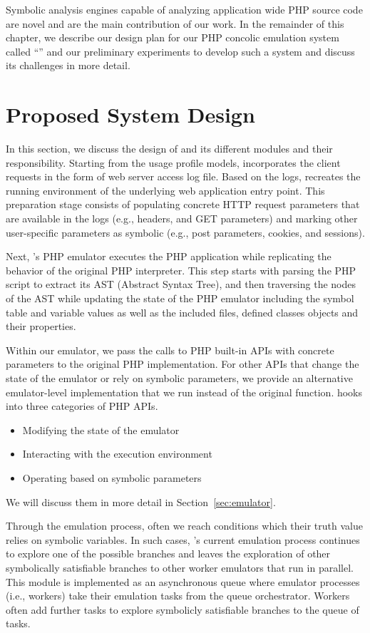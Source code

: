 Symbolic analysis engines capable of analyzing application wide PHP source code are novel and are the main contribution of our work. 
In the remainder of this chapter, we describe our design plan for our PHP concolic emulation system called ``\animatedead{}'' and our preliminary experiments to develop such a system and discuss its challenges in more detail. 

\section{Proposed System Design}
In this section, we discuss the design of \animatedead{} and its different modules and their responsibility. 
Starting from the usage profile models, \animatedead{} incorporates the client requests in the form of web server access log file. 
Based on the logs, \animatedead{} recreates the running environment of the underlying web application entry point. 
This preparation stage consists of populating concrete HTTP request parameters that are available in the logs (e.g., headers, and GET parameters) and marking other user-specific parameters as symbolic (e.g., post parameters, cookies, and sessions). 

Next, \animatedead{}'s PHP emulator executes the PHP application while replicating the behavior of the original PHP interpreter. 
This step starts with parsing the PHP script to extract its AST (Abstract Syntax Tree), and then traversing the nodes of the AST while updating the state of the PHP emulator including the symbol table and variable values as well as the included files, defined classes objects and their properties. 

Within our emulator, we pass the calls to PHP built-in APIs with concrete parameters to the original PHP implementation. 
For other APIs that change the state of the emulator or rely on symbolic parameters, we provide an alternative emulator-level implementation that we run instead of the original function. 
\animatedead{} hooks into three categories of PHP APIs. 
\begin{itemize}
    \item Modifying the state of the emulator
    \item Interacting with the execution environment
    \item Operating based on symbolic parameters
\end{itemize}
We will discuss them in more detail in Section~\ref{sec:emulator}.

Through the emulation process, often we reach conditions which their truth value relies on symbolic variables. 
In such cases, \animatedead{}'s current emulation process continues to explore one of the possible branches and leaves the exploration of other symbolically satisfiable branches to other worker emulators that run in parallel. 
This module is implemented as an asynchronous queue where emulator processes (i.e., workers) take their emulation tasks from the queue orchestrator. 
Workers often add further tasks to explore symbolicly satisfiable branches to the queue of tasks. 

